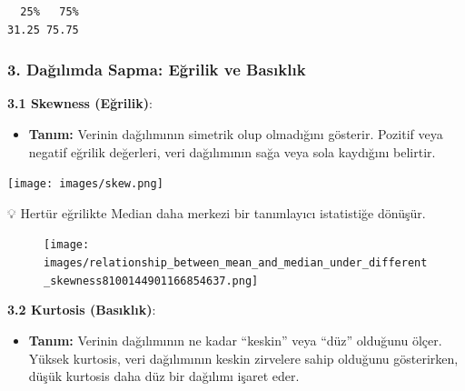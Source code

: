 \documentclass[
  letterpaper,
  DIV=11,
  numbers=noendperiod]{scrartcl}
\providecommand{\tightlist}{%
  \setlength{\itemsep}{0pt}\setlength{\parskip}{0pt}}\usepackage{longtable,booktabs,array}
\begin{document}
\begin{verbatim}
  25%   75% 
31.25 75.75 
\end{verbatim}

\hypertarget{daux11fux131lux131mda-sapma-eux11frilik-ve-basux131klux131k}{%
\subsubsection{\texorpdfstring{3. Dağılımda Sapma: \textbf{Eğrilik ve
Basıklık}}{3. Dağılımda Sapma: Eğrilik ve Basıklık}}\label{daux11fux131lux131mda-sapma-eux11frilik-ve-basux131klux131k}}

\textbf{3.1 Skewness (Eğrilik)}:

\begin{itemize}
\tightlist
\item
  \textbf{Tanım:} Verinin dağılımının simetrik olup olmadığını gösterir.
  Pozitif veya negatif eğrilik değerleri, veri dağılımının sağa veya
  sola kaydığını belirtir.
\end{itemize}

\texttt{[image: images/skew.png]}

\begin{tcolorbox}[enhanced jigsaw, bottomrule=.15mm, opacitybacktitle=0.6, rightrule=.15mm, left=2mm, toprule=.15mm, leftrule=.75mm, titlerule=0mm, colframe=quarto-callout-note-color-frame, opacityback=0, arc=.35mm, colbacktitle=quarto-callout-note-color!10!white, title=\textcolor{quarto-callout-note-color}{\faInfo}\hspace{0.5em}{Not}, coltitle=black, breakable, bottomtitle=1mm, toptitle=1mm, colback=white]

💡 Hertür eğrilikte Median daha merkezi bir tanımlayıcı istatistiğe
dönüşür.

\begin{figure}[H]

{\centering \texttt{[image: images/relationship\_between\_mean\_and\_median\_under\_different\_skewness8100144901166854637.png]}

}

\end{figure}

\end{tcolorbox}

\textbf{3.2 Kurtosis (Basıklık)}:

\begin{itemize}
\tightlist
\item
  \textbf{Tanım:} Verinin dağılımının ne kadar ``keskin'' veya ``düz''
  olduğunu ölçer. Yüksek kurtosis, veri dağılımının keskin zirvelere
  sahip olduğunu gösterirken, düşük kurtosis daha düz bir dağılımı
  işaret eder.
\end{itemize}
\end{document}
